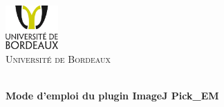 %

\begin{titlepage}

\begin{center}


\includegraphics[width=0.15\textwidth]{logounibdx.png}\\[1cm]

\textsc{\LARGE Université de Bordeaux}\\[1.5cm]
\vspace*{0.5cm}

\vspace*{1cm}

\HRule \\[0.3cm]
{ \huge \bfseries Mode d'emploi du plugin ImageJ Pick\_EM}\\[0.3cm]

\HRule \\[1.5cm]


\end{center}
\end{titlepage}

